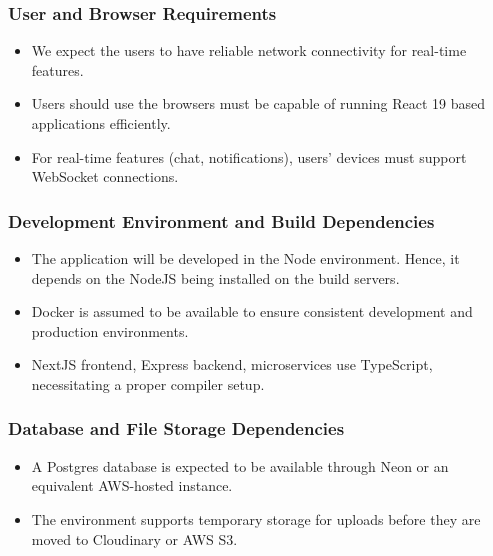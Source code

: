 \documentclass{FastFyp}
\begin{document}
\subsubsection{User and Browser Requirements}

\begin{itemize}
\item We expect the users to have reliable network connectivity for real-time features.
\item Users should use the browsers must be capable of running React 19 based applications efficiently.
\item For real-time features (chat, notifications), users’ devices must support WebSocket connections.
\end{itemize}



\subsubsection{Development Environment and Build Dependencies}

\begin{itemize}
    \item The application will be developed in the Node environment.  Hence, it depends on the NodeJS being installed on the build servers.

    \item Docker is assumed to be available to ensure consistent development and production environments.

    \item NextJS frontend, Express backend, microservices use TypeScript, necessitating a proper compiler setup.

\end{itemize}

\subsubsection{Database and File Storage Dependencies}

\begin{itemize}
    \item A Postgres database is expected to be available through Neon or an equivalent AWS-hosted instance.

    \item The environment supports temporary storage for uploads before they are moved to Cloudinary or AWS S3.

\end{itemize}
\end{document}
